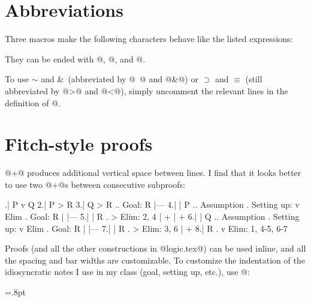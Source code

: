 \pagebreak
\itmath

\section{Abbreviations}

Three macros make the following characters behave like the listed expressions:

\noindent\hfil\vbox\bgroup{}\egroup\hfil

\noindent They can be ended with @\endconnectives@, @\endquantifiers@, and @\resetasterisk@.

To use $\sim$ and \&\ (abbreviated by @~@ and @&@) or $\supset$ and $\equiv$ (still abbreviated by @>@ and @<@), simply uncomment the relevant lines in the definition of @\connectives@.

\section{Fitch-style proofs}

@+@ produces additional vertical space between lines. I find that it looks better to use two @+@s between consecutive subproofs:

.| P v Q
 2.| P > R
 3.| Q > R  ..  Goal: R
   |---
 4.|   | P  ..  Assumption  .  Setting up: v Elim  .  Goal: R
   |   |---
 5.|   | R  .  > Elim: 2, 4
   |   +
   |   +
 6.|   | Q  ..  Assumption  .  Setting up: v Elim  .  Goal: R
   |   |---
 7.|   | R  .  > Elim: 3, 6
   |   +
 8.| R      .  v Elim: 1, 4-5, 6-7
\endfitchproof

Proofs (and all the other constructions in @logic.tex@) can be used inline, and all the spacing and bar widths are customizable. To customize the indentation of the idiosyncratic notes I use in my class (goal, setting up, etc.), use @\fitchproofindentby@:

\fitchrowheight=10.5pt \fitchrowdepth=3.5pt%
\fitchbarrowheight=4pt \fitchbarrowdepth=4pt%
\fitchbarlength=12pt%
\fitchlinethickness=.8pt%
\fitchpaddingthickness=2pt%
\fitchspace=4pt%

